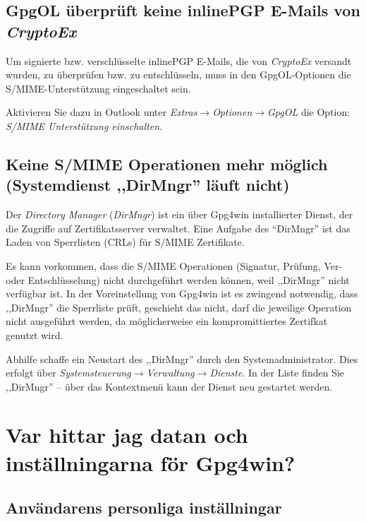 \documentclass[a4paper,11pt, oneside,openright,titlepage,dvips]{scrbook}
\newcommand{\Menu}[1]{\emph{#1}}
\newcommand{\Email}{E-Mail}
\newcommand\margin[1]{\marginline {\sffamily\scriptsize #1}}
\newcommand{\IncludeImage}[2][]{\texorhtml{%
\texttt{[image: \#2]}%
}{%
\htmlimg{#2.png}%
}}
\newcounter{chapter}
\newcounter{section}[chapter]
\begin{document}
\section{GpgOL überprüft keine inlinePGP \Email{}s von \textit{CryptoEx}}

Um signierte bzw. verschlüsselte inlinePGP \Email{}s, die von
\textit{CryptoEx} versandt wurden, zu überprüfen bzw. zu
entschlüsseln, muss in den GpgOL-Optionen die S/MIME-Unterstützung
eingeschaltet sein.

Aktivieren Sie dazu in Outlook unter
\Menu{Extras$\rightarrow$Optionen$\rightarrow$GpgOL} die Option:\\
\textit{S/MIME Unterstützung einschalten}.


\section{Keine S/MIME Operationen mehr möglich (Systemdienst ,,DirMngr'' läuft nicht)}
\label{dirmngr-restart}
\T\margin{\IncludeImage[width=1.5cm]{smime-icon}}

Der \textit{Directory Manager} (\textit{DirMngr}) ist ein über 
Gpg4win installierter Dienst, der die Zugriffe auf Zertifikatsserver
verwaltet. Eine Aufgabe des "`DirMngr"' ist das Laden
von Sperrlisten (CRLs) für S/MIME Zertifikate.

Es kann vorkommen, dass die S/MIME Operationen (Signatur, Prüfung,
Ver- oder Entschlüsselung) nicht durchgeführt werden können, weil
,,DirMngr'' nicht verfügbar ist. In der Voreinstellung von Gpg4win
ist es zwingend notwendig, dass ,,DirMngr'' die Sperrliste prüft,
geschieht das nicht, darf die jeweilige Operation nicht ausgeführt
werden, da möglicherweise ein kompromittiertes Zertifkat genutzt wird.

Abhilfe schaffe ein Neustart des ,,DirMngr'' durch den
Systemadministrator.
Dies erfolgt über \linebreak
\Menu{Systemsteuerung$\rightarrow$Verwaltung$\rightarrow$Dienste}.
In der Liste finden Sie ,,DirMngr'' --
über das Kontextmenü kann der Dienst neu gestartet werden.



\clearpage
{}
\chapter{Var hittar jag datan och inställningarna för Gpg4win?}

\section{Användarens personliga inställningar}
\end{document}
